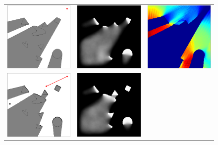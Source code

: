 
\begin{figure}
\centering
 \begin{tabular}{ccc}
\includegraphics[width=1.5in]{2D/scene_01}&
\includegraphics[width=1.5in]{2D/marginal_01}&
\includegraphics[width=1.5in]{2D/energy_01}\\
\includegraphics[width=1.5in]{2D/scene_02}&
\includegraphics[width=1.5in]{2D/marginal_02}&

\end{tabular}
\end{figure}
